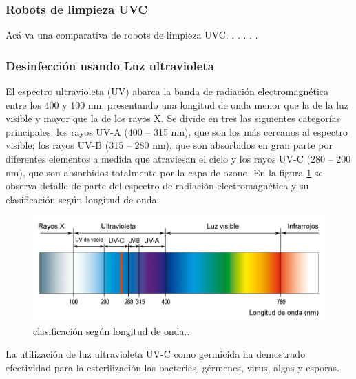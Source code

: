 
\subsubsection{Robots de limpieza UVC}

Acá va una comparativa de robots de limpieza UVC.
.
.
.
.
.

\subsubsection{Desinfección usando Luz ultravioleta}

El espectro ultravioleta (UV) abarca la banda de radiación electromagnética entre los 400 y 100 nm, presentando una longitud de onda menor que la de la luz visible y mayor que la de los rayos X.  Se divide en tres las siguientes categorías principales: los rayos UV-A (400 – 315 nm), que son los más cercanos al espectro visible; los rayos UV-B (315 – 280 nm), que son absorbidos en gran parte por diferentes elementos a medida que atraviesan el cielo y los rayos UV-C (280 – 200 nm), que son absorbidos totalmente por la capa de ozono. En la  figura \ref{fig:espectro} se observa detalle de parte del espectro de radiación electromagnética y  su clasificación según longitud de onda.


\begin{figure}[h]
	\centering
	\includegraphics[width=\textwidth]{./Figures/espectro.PNG}
	\caption{clasificación según longitud de onda.\protect\footnotemark.}
	\label{fig:espectro}
\end{figure}

La utilización de luz ultravioleta UV-C como germicida ha demostrado efectividad para la esterilización  las bacterias, gérmenes, virus, algas y esporas. 

